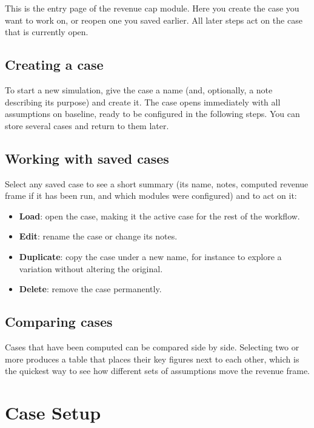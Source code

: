 This is the entry page of the revenue cap module. Here you create the case you want to work on, or reopen one you saved earlier. All later steps act on the case that is currently open.

\subsection{Creating a case}
To start a new simulation, give the case a name (and, optionally, a note describing its purpose) and create it. The case opens immediately with all assumptions on baseline, ready to be configured in the following steps. You can store several cases and return to them later.

\subsection{Working with saved cases}
Select any saved case to see a short summary (its name, notes, computed revenue frame if it has been run, and which modules were configured) and to act on it:

\begin{itemize}
  \item \textbf{Load}: open the case, making it the active case for the rest of the workflow.
  \item \textbf{Edit}: rename the case or change its notes.
  \item \textbf{Duplicate}: copy the case under a new name, for instance to explore a variation without altering the original.
  \item \textbf{Delete}: remove the case permanently.
\end{itemize}

\subsection{Comparing cases}
Cases that have been computed can be compared side by side. Selecting two or more produces a table that places their key figures next to each other, which is the quickest way to see how different sets of assumptions move the revenue frame.


\section{Case Setup}
\label{sec:page-setup}

